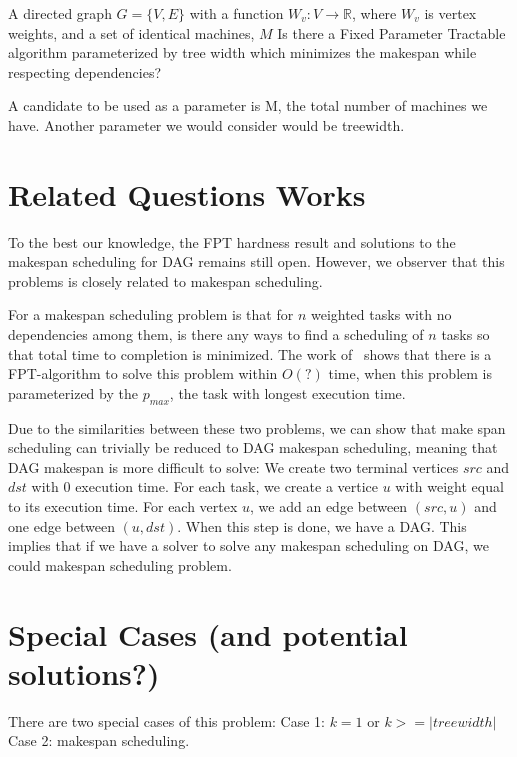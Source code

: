 \documentclass{article}
\begin{document}
%
{A directed graph $G = \{V, E\}$ with a function $W_v: V \to \mathbb{R}$,
 where $W_v$ is vertex weights, and a set of identical machines,
$M$}%
{}%
{Is there a Fixed Parameter Tractable algorithm parameterized by tree width
which  minimizes the makespan while respecting
dependencies?}%

A candidate to be used as a parameter is M, the total number of machines
we have. Another parameter we would consider would be treewidth.

\section{Related Questions Works}
To the best our knowledge, the FPT hardness result and solutions to the 
makespan scheduling for DAG remains still open. 
However, we observer that this problems is closely related to makespan scheduling.

For a makespan scheduling problem is that for $n$ weighted tasks with no
dependencies among them, is there any ways to find a scheduling of $n$
tasks so that total time to completion is minimized. The work of~\cite{keylist}
shows that there is a FPT-algorithm to solve this problem within $O(?)$ time,
when this problem is parameterized by the $p_{max}$, the task with longest
execution time.

Due to the similarities between these two problems, we can show that make
span scheduling can trivially be reduced to DAG makespan scheduling, meaning
that DAG makespan is more difficult to solve:
We create two terminal vertices $src$ and $dst$ with 0 execution time. For each
task, we create a vertice $u$ with weight equal to its execution time. For each
vertex $u$, we add an edge between $(src,u)$ and one edge between $(u,dst)$. 
When this step is done, we have a DAG. 
This implies that if we have a solver to solve any makespan
scheduling on DAG, we could makespan scheduling problem. 

\section{Special Cases (and potential solutions?)}
There are two special cases of this problem:
Case 1: $k = 1$ or $k >= |treewidth|$ \\
Case 2: makespan scheduling.
\end{document}
